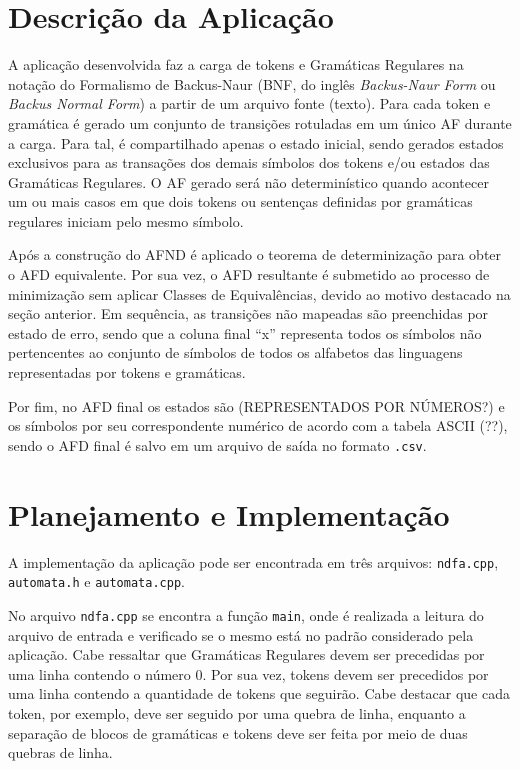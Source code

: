 \documentclass[12pt]{article}
\begin{document}
\section{Descrição da Aplicação}
\label{3}

A aplicação desenvolvida faz a carga de tokens e Gramáticas Regulares na notação do Formalismo de Backus-Naur (BNF, do inglês {\it Backus-Naur Form} ou {\it Backus Normal Form}) a partir de um arquivo fonte (texto). Para cada token e gramática é gerado um conjunto de transições rotuladas em um único AF durante a carga. Para tal, é compartilhado apenas o estado inicial, sendo gerados estados exclusivos para as transações dos demais símbolos dos tokens e/ou estados das Gramáticas Regulares. O AF gerado será não determinístico quando acontecer um ou mais casos em que dois tokens ou sentenças definidas por gramáticas regulares iniciam pelo mesmo símbolo.

Após a construção do AFND é aplicado o teorema de determinização para obter o AFD equivalente. Por sua vez, o AFD resultante é submetido ao processo de minimização sem aplicar Classes de Equivalências, devido ao motivo destacado na seção anterior. Em sequência, as transições não mapeadas são preenchidas por estado de erro, sendo que a coluna final ``x'' representa todos os símbolos não pertencentes ao conjunto de símbolos de todos os alfabetos das linguagens representadas por tokens e gramáticas.

Por fim, no AFD final os estados são (REPRESENTADOS POR NÚMEROS?) e os símbolos por seu correspondente numérico de acordo com a tabela ASCII (??), sendo o AFD final é salvo em um arquivo de saída no formato \texttt{.csv}.

\section{Planejamento e Implementação}
\label{4}

A implementação da aplicação pode ser encontrada em três arquivos: \texttt{ndfa.cpp}, \texttt{automata.h} e \texttt{automata.cpp}.

No arquivo \texttt{ndfa.cpp} se encontra a função \texttt{main}, onde é realizada a leitura do arquivo de entrada e verificado se o mesmo está no padrão considerado pela aplicação. Cabe ressaltar que Gramáticas Regulares devem ser precedidas por uma linha contendo o número $0$. Por sua vez, tokens devem ser precedidos por uma linha contendo a quantidade de tokens que seguirão. Cabe destacar que cada token, por exemplo, deve ser seguido por uma quebra de linha, enquanto a separação de blocos de gramáticas e tokens deve ser feita por meio de duas quebras de linha.
\end{document}
